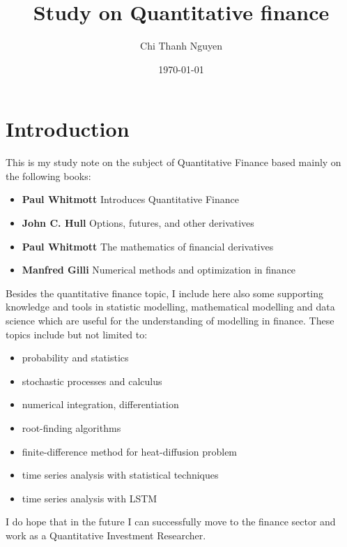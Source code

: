 \documentclass[11pt,a4paper]{report}
\begin{document}
\title{Study on Quantitative finance}
\author{Chi Thanh Nguyen}
\date{\today \@ \currenttime}
\maketitle

\tableofcontents


\chapter{Introduction}
This is my study note on the subject of Quantitative Finance based mainly on the following books:
\begin{itemize}
	\setlength\itemsep{0em}
	\item \textbf{Paul Whitmott} Introduces Quantitative Finance \cite{pw_iqf2ed_2007}
	\item \textbf{John C. Hull} Options, futures, and other derivatives \cite{ch_ofd9ed_2015}
	\item \textbf{Paul Whitmott} The mathematics of financial derivatives \cite{pw_mathfinderiv_1995}
	\item \textbf{Manfred Gilli} Numerical methods and optimization in finance \cite{mg_nmof_2019} 	
\end{itemize}

Besides the quantitative finance topic, I include here also some supporting knowledge and tools in statistic modelling, mathematical modelling and data science which are useful for the understanding of modelling in finance. These topics include but not limited to:

\begin{itemize}
	\setlength\itemsep{0em}
	\item probability and statistics
	\item stochastic processes and calculus
	\item numerical integration, differentiation
	\item root-finding algorithms
	\item finite-difference method for heat-diffusion problem
	\item time series analysis with statistical techniques
	\item time series analysis with LSTM
\end{itemize}

I do hope that in the future I can successfully move to the finance sector and work as a Quantitative Investment Researcher. 


\appendix 
%
%
%
%
%
%
%



\printindex



\end{document}
